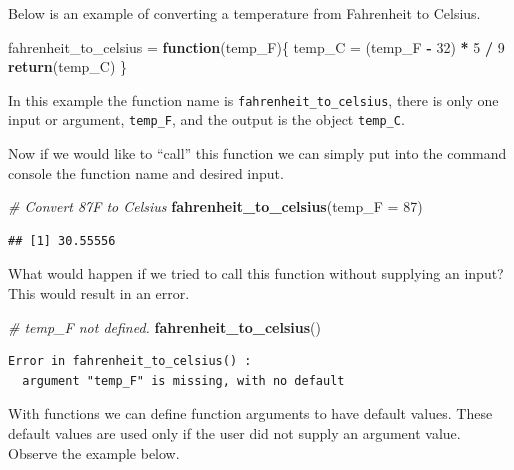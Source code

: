 \documentclass[
]{book}
\newenvironment{Shaded}{\begin{snugshade}}{\end{snugshade}}
\newcommand{\CommentTok}[1]{\textcolor[rgb]{0.56,0.35,0.01}{\textit{#1}}}
\newcommand{\ControlFlowTok}[1]{\textcolor[rgb]{0.13,0.29,0.53}{\textbf{#1}}}
\newcommand{\DataTypeTok}[1]{\textcolor[rgb]{0.13,0.29,0.53}{#1}}
\newcommand{\DecValTok}[1]{\textcolor[rgb]{0.00,0.00,0.81}{#1}}
\newcommand{\KeywordTok}[1]{\textcolor[rgb]{0.13,0.29,0.53}{\textbf{#1}}}
\newcommand{\NormalTok}[1]{#1}
\newcommand{\OperatorTok}[1]{\textcolor[rgb]{0.81,0.36,0.00}{\textbf{#1}}}
\newcommand{\StringTok}[1]{\textcolor[rgb]{0.31,0.60,0.02}{#1}}
\begin{document}
Below is an example of converting a temperature from Fahrenheit to Celsius.

\begin{Shaded}
\begin{Highlighting}[]
\NormalTok{fahrenheit_to_celsius =}\StringTok{ }\ControlFlowTok{function}\NormalTok{(temp_F)\{}
\NormalTok{  temp_C =}\StringTok{ }\NormalTok{(temp_F }\OperatorTok{-}\StringTok{ }\DecValTok{32}\NormalTok{) }\OperatorTok{*}\StringTok{ }\DecValTok{5} \OperatorTok{/}\StringTok{ }\DecValTok{9}
  \KeywordTok{return}\NormalTok{(temp_C)}
\NormalTok{\}}
\end{Highlighting}
\end{Shaded}

In this example the function name is \texttt{fahrenheit\_to\_celsius}, there is only one input or argument, \texttt{temp\_F}, and the output is the object \texttt{temp\_C}.

Now if we would like to ``call'' this function we can simply put into the command console the function name and desired input.

\begin{Shaded}
\begin{Highlighting}[]
\CommentTok{# Convert 87F to Celsius}
\KeywordTok{fahrenheit_to_celsius}\NormalTok{(}\DataTypeTok{temp_F =} \DecValTok{87}\NormalTok{)}
\end{Highlighting}
\end{Shaded}

\begin{verbatim}
## [1] 30.55556
\end{verbatim}

What would happen if we tried to call this function without supplying an input? This would result in an error.

\begin{Shaded}
\begin{Highlighting}[]
\CommentTok{# temp_F not defined. }
\KeywordTok{fahrenheit_to_celsius}\NormalTok{()}
\end{Highlighting}
\end{Shaded}

\begin{verbatim}
Error in fahrenheit_to_celsius() : 
  argument "temp_F" is missing, with no default
\end{verbatim}

With functions we can define function arguments to have default values. These default values are used only if the user did not supply an argument value. Observe the example below.
\end{document}
